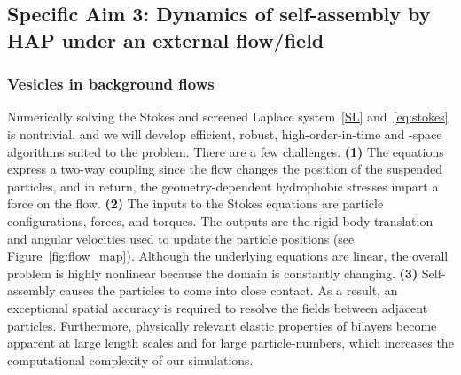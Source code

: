\subsection{Specific Aim 3: Dynamics of self-assembly by HAP under an external flow/field}
\label{subsec:specific_aim_3}

\subsubsection{Vesicles in background flows}
Numerically solving the Stokes and screened Laplace system~\eqref{SL}
and~\eqref{eq:stokes} is nontrivial, and we will develop efficient,
robust, high-order-in-time and -space algorithms suited to the problem.
There are a few challenges. {\bf (1)} The equations express a two-way coupling
since the flow changes the position of the suspended particles,
and in return, the geometry-dependent hydrophobic stresses impart a force
on the flow. {\bf (2)} The inputs to the Stokes equations are particle
configurations, forces, and torques. The outputs are the rigid body
translation and angular velocities used to update the particle positions
(see Figure~\ref{fig:flow_map}). Although the underlying equations are
linear, the overall problem is highly nonlinear because the domain is
constantly changing. {\bf (3)} Self-assembly causes the particles to
come into close contact. As a result, an exceptional spatial accuracy is
required to resolve the fields between adjacent particles. Furthermore, 
physically relevant elastic properties of bilayers become apparent at
large length scales and for large particle-numbers, which increases the
computational complexity of our simulations. 

